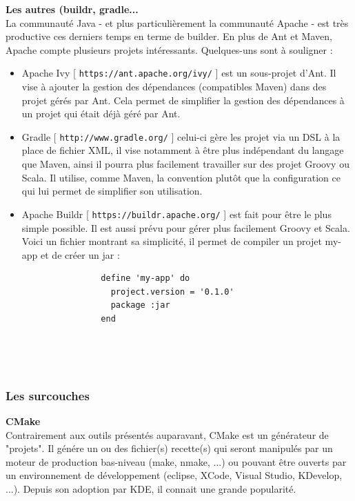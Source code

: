 \documentclass[11pt,twoside,a4paper]{article}
\begin{document}
\textbf{Les autres (buildr, gradle...}~\\

La communaut{\'e} Java - et plus particuli{\`e}rement la communaut{\'e} Apache - est tr{\`e}s productive ces derniers temps en terme de builder. En plus de Ant et Maven, Apache compte plusieurs projets int{\'e}ressants. Quelques-uns sont {\`a} souligner :
\begin{itemize}
	\item Apache Ivy [ \texttt{https://ant.apache.org/ivy/} ]  est un sous-projet d'Ant. Il vise {\`a} ajouter la gestion des d{\'e}pendances (compatibles Maven) dans des projet g{\'e}r{\'e}s par Ant. Cela permet de simplifier la gestion des d{\'e}pendances {\`a} un projet qui {\'e}tait d{\'e}j{\`a} g{\'e}r{\'e} par Ant.
	\item Gradle [ \texttt{http://www.gradle.org/} ] celui-ci g{\`e}re les projet via un DSL {\`a} la place de fichier XML, il vise notamment {\`a} {\^e}tre plus ind{\'e}pendant du langage que Maven, ainsi il pourra plus facilement travailler sur des projet Groovy ou Scala. Il utilise, comme Maven, la convention plut{\^o}t que la configuration ce qui lui permet de simplifier son utilisation. %
	\item Apache Buildr [ \texttt{https://buildr.apache.org/} ] est fait pour {\^e}tre le plus simple possible. Il est aussi pr{\'e}vu pour g{\'e}rer plus facilement Groovy et Scala. Voici un fichier montrant sa simplicit{\'e}, il permet de compiler un projet my-app et de cr{\'e}er un jar :~\\
		\begin{verbatim}
				define 'my-app' do
				  project.version = '0.1.0'
				  package :jar
				end
		 \end{verbatim}~\\
\end{itemize}~\\

\subsubsection{Les surcouches}
\textbf{CMake}~\\

Contrairement aux outils pr{\'e}sent{\'e}s auparavant, CMake est un g{\'e}n{\'e}rateur de "projets". Il g{\'e}n{\'e}re un ou des fichier(s) recette(s) qui seront manipul{\'e}s par un moteur de production bas-niveau (make, nmake, ...) ou pouvant {\^e}tre ouverts par un environnement de d{\'e}veloppement (eclipse, XCode, Visual Studio, KDevelop, ...). Depuis son adoption par KDE, il connait une grande popularit{\'e}.~\\
\end{document}
